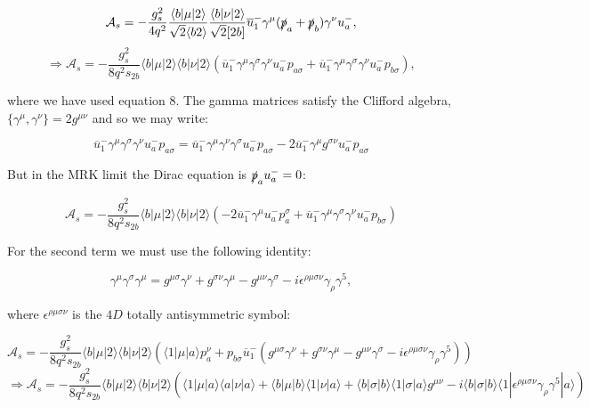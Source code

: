 			\begin{equation}
			\mathcal{A}_s=-\frac{g^2_s}{4q^2}\frac{\langle{b}|\mu|2\rangle}{\sqrt{2}\langle{b2\rangle}}\frac{\langle{b}|\nu|2\rangle}{\sqrt{2}[2b]}\overline{u}^-_1\gamma^\mu(\slashed{p}_a+\slashed{p}_b)\gamma^\nu u^-_a,
			\end{equation}
			\begin{equation*}
			\Rightarrow\mathcal{A}_s=-\frac{g^2_s}{8q^2s_{2b}}\langle{b}|\mu|2\rangle\langle{b}|\nu|2\rangle\left(\overline{u}^-_1\gamma^\mu\gamma^\sigma\gamma^\nu u^-_ap_{a\sigma}+\overline{u}^-_1\gamma^\mu\gamma^\sigma\gamma^\nu u^-_ap_{b\sigma}\right),
			\end{equation*}

			where we have used equation 8.  The gamma matrices satisfy the Clifford algebra, $\{\gamma^\mu, \gamma^\nu\}=2g^{\mu\nu}$ and so we may write:

			\begin{equation}
			\overline{u}^-_1\gamma^\mu\gamma^\sigma\gamma^\nu u^-_ap_{a\sigma}=\overline{u}^-_1\gamma^\mu\gamma^\nu\gamma^\sigma u^-_ap_{a\sigma} - 2\overline{u}^-_1\gamma^\mu g^{\sigma\nu}u^-_ap_{a\sigma}
			\end{equation}

			But in the MRK limit the Dirac equation is $\slashed{p}_au^-_a=0$:

			\begin{equation}
			\mathcal{A}_s=-\frac{g^2_s}{8q^2s_{2b}}\langle{b}|\mu|2\rangle\langle{b}|\nu|2\rangle\left(-2\overline{u}^-_1\gamma^\mu u^-_ap_{a}^\sigma+\overline{u}^-_1\gamma^\mu\gamma^\sigma\gamma^\nu u^-_ap_{b\sigma}\right)
			\end{equation}

			For the second term we must use the following identity:

			\begin{equation}
			\gamma^\mu\gamma^\sigma\gamma^\mu=g^{\mu\sigma}\gamma^\nu + g^{\sigma\nu}\gamma^\mu - g^{\mu\nu}\gamma^\sigma - i\epsilon^{\rho\mu\sigma\nu}\gamma_\rho\gamma^5,
			\end{equation}

			where $\epsilon^{\rho\mu\sigma\nu}$ is the $4D$ totally antisymmetric symbol:

			\begin{equation}
			\mathcal{A}_s=-\frac{g^2_s}{8q^2s_{2b}}\langle{b}|\mu|2\rangle\langle{b}|\nu|2\rangle
			\left(\langle 1|\mu|a\rangle p_a^\nu + p_{b\sigma}\overline{u}^-_1(g^{\mu\sigma}\gamma^\nu + g^{\sigma\nu}\gamma^\mu - g^{\mu\nu}\gamma^\sigma - i\epsilon^{\rho\mu\sigma\nu}\gamma_\rho\gamma^5)\right)
			\end{equation}
			\begin{equation}
			\Rightarrow\mathcal{A}_s=-\frac{g^2_s}{8q^2s_{2b}}\langle{b}|\mu|2\rangle\langle{b}|\nu|2\rangle
			\left(\langle 1|\mu|a\rangle \langle a|\nu|a\rangle\!+\!\langle b|\mu|b\rangle\langle 1|\nu|a\rangle\!+\!\langle b|\sigma|b\rangle\langle1|\sigma|a\rangle
			g^{\mu\nu}\!-\!i\langle b|\sigma|b\rangle\langle 1|\epsilon^{\rho\mu\sigma\nu}\gamma_\rho\gamma^5|a\rangle\right)
			\end{equation}

